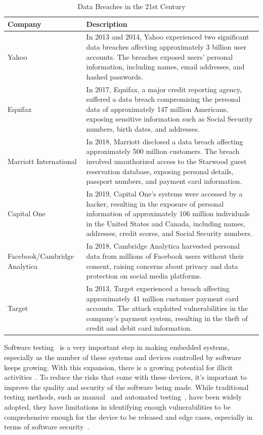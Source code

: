 \begin{table}[ht]
      \centering
      \caption{Data Breaches in the 21st Century}
      \label{tab:data_breaches}
      \begin{tabularx}{\textwidth}{|l|X|}
      \hline
      \textbf{Company} & \textbf{Description} \\
      \hline
      Yahoo & In 2013 and 2014, Yahoo experienced two significant data breaches affecting approximately 3 billion user accounts. The breaches exposed users' personal information, including names, email addresses, and hashed passwords. \\
      \hline
      Equifax & In 2017, Equifax, a major credit reporting agency, suffered a data breach compromising the personal data of approximately 147 million Americans, exposing sensitive information such as Social Security numbers, birth dates, and addresses. \\
      \hline
      Marriott International & In 2018, Marriott disclosed a data breach affecting approximately 500 million customers. The breach involved unauthorized access to the Starwood guest reservation database, exposing personal details, passport numbers, and payment card information. \\
      \hline
      Capital One & In 2019, Capital One's systems were accessed by a hacker, resulting in the exposure of personal information of approximately 106 million individuals in the United States and Canada, including names, addresses, credit scores, and Social Security numbers. \\
      \hline
      Facebook/Cambridge Analytica & In 2018, Cambridge Analytica harvested personal data from millions of Facebook users without their consent, raising concerns about privacy and data protection on social media platforms. \\
      \hline
      Target & In 2013, Target experienced a breach affecting approximately 41 million customer payment card accounts. The attack exploited vulnerabilities in the company's payment system, resulting in the theft of credit and debit card information. \\
      \hline
      \end{tabularx}
\end{table}


Software testing~\cite{myers2011art} is a very important step in making embedded
systems, especially as the number of these systems and devices controlled by
software keeps growing. With this expansion, there is a growing potential for
illicit activities~\cite{broekman2003testing}. To reduce the risks that come
with these devices, it's important to improve the quality and security of the
software being made.
While traditional testing methods, such as manual~\cite{itkonen2009testers} and automated testing~\cite{asfaw2015benefits},
have been widely adopted, they have limitations in identifying
enough vulnerabilities to be comprehensive enough for the device to be released
and edge cases, especially in terms of software security~\cite{819971}.


